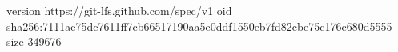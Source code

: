 version https://git-lfs.github.com/spec/v1
oid sha256:7111ae75dc7611ff7cb66517190aa5e0ddf1550eb7fd82cbe75c176c680d5555
size 349676

